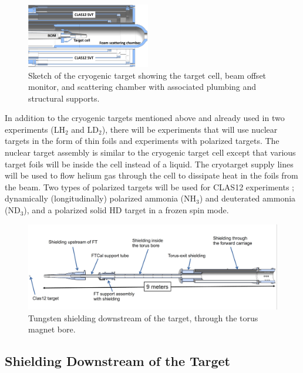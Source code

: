 \begin{figure}[t]
\begin{center}
\includegraphics[width=0.48\textwidth]{target_sch.pdf}
\caption{Sketch of the cryogenic target showing the target cell, beam offset monitor, and scattering chamber
  with associated plumbing and structural supports.}
\label{fig:targsch}
\end{center}
\end{figure}

In addition to the cryogenic targets mentioned above and already used in two experiments (LH$_2$ and LD$_2$),
there will be experiments that will use nuclear targets in the form of thin foils and experiments with polarized
targets. The nuclear target assembly is similar to the cryogenic target cell except that various target foils will be
inside the cell instead of a liquid. The cryotarget supply lines will be used to flow helium gas through the cell to
dissipate heat in the foils from the beam. Two types of polarized targets will be used for CLAS12 experiments
\cite{Keith:2015ete}; dynamically (longitudinally) polarized ammonia (NH$_3$) and deuterated ammonia (ND$_3$),
and a polarized solid HD target in a frozen spin mode. 

\begin{figure}[ht]
\begin{center}
\includegraphics[width=1.0\textwidth]{beamline_hall_shielding.pdf}
\caption{Tungsten shielding downstream of the target, through the torus magnet bore.}
\label{fig:shield}
\end{center}
\end{figure}

\subsection{Shielding Downstream of the Target} 

